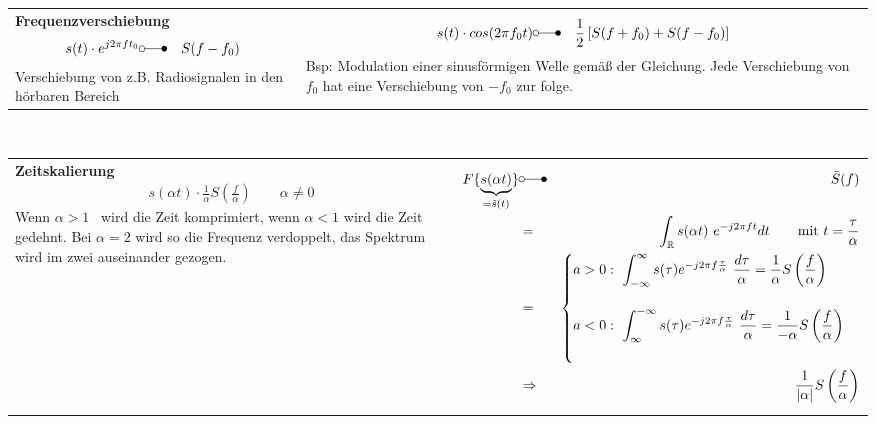 \begin{tabular}{ll}
 \addtolength{\jot}{2mm}
 \parbox{5cm}{
  \centering
\textbf{Frequenzverschiebung}
\begin{eqnarray*}
s(t) \cdot e^{j2 \pi f t_0} &\laplace& S(f-f_0)
\end{eqnarray*}
Verschiebung von z.B. Radiosignalen in den hörbaren Bereich
}
 &
 \parbox{5cm}{

\begin{eqnarray*}
s(t) \cdot cos(2 \pi f_0t) &\laplace& \frac{1}{2}\left[ S(f+f_0) + S(f-f_0)\right] 
\end{eqnarray*}
Bsp: Modulation einer sinusförmigen Welle gemäß der Gleichung. Jede Verschiebung von $f_0$ hat eine Verschiebung von $-f_0$ zur folge.
}
\end{tabular}\\
\vspace{6pt}
\begin{tabular}{ll}
 \addtolength{\jot}{2mm}
 \parbox{4cm}{
  \centering
\textbf{Zeitskalierung}
\begin{eqnarray*}
s(\alpha t) \cdot \frac{1}{\alpha} S\left( \frac{f}{\alpha}\right) \qquad \alpha \ne 0 
\end{eqnarray*}
\flushleft
Wenn $\alpha > 1$~ wird die Zeit komprimiert, wenn $\alpha < 1$ wird die Zeit gedehnt. Bei $\alpha = 2$ wird so die Frequenz verdoppelt, das Spektrum wird im zwei auseinander gezogen.
}
 &
 \parbox{5cm}{
\begin{eqnarray*}
F\lbrace \underbrace{s(\alpha t)}_{=\tilde{s}(t)} \rbrace &\laplace& \tilde{S}(f)\\
&=& \int_\mathbb{R} s(\alpha t) ~e^{-j2 \pi ft} dt \qquad \text{mit $t = \frac{\tau}{\alpha}$}\\
&=& \begin{cases} 
a > 0: ~  \displaystyle \int_{-\infty}^{\infty} s(\tau) e^{-j2 \pi f \frac{\tau}{\alpha}}~ \frac{d\tau}{\alpha} = \frac{1}{\alpha} S\left( \frac{f}{\alpha}\right) \\[2em]
a < 0: ~  \displaystyle \int_{\infty}^{-\infty} s(\tau) e^{-j2 \pi f \frac{\tau}{\alpha}}~ \frac{d\tau}{\alpha} = \frac{1}{- \alpha} S\left( \frac{f}{\alpha}\right) \\[2em]
\end{cases}\\
&\Rightarrow& \frac{1}{\vert \alpha \vert} S\left( \frac{f}{\alpha} \right) 
\end{eqnarray*}
}
\end{tabular}\\~
\vspace{6pt}
